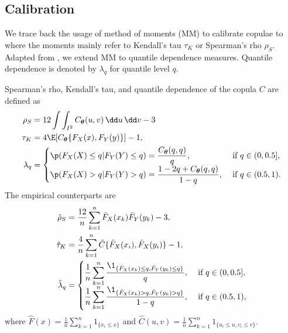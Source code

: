 \documentclass[11pt,a4paper,english]{article}
\begin{document}
\subsection{Calibration}\label{sec:estimation}
We trace back the usage of method of moments (MM) to calibrate copulae to \citet{Genest1987, genest1993statistical} 
where the moments mainly refer to Kendall's tau $\tau_K$ or Spearman's rho $\rho_S$.
Adapted from \cite{oh2013simulated}, we extend MM to quantile dependence measures. 
Quantile dependence is denoted by $\lambda_q$ for quantile level $q$.

Spearman's rho, Kendall's tau, and quantile dependence of the copula $C$ are defined as
\begin{align*}
  \rho_S &= 12 \int\int_{I^2} C_{\bm{\theta}}(u,v)\, \dd u\, \dd v-3\label{eq:rho_S}\\
  \tau_K &= 4\E[C_{\bm{\theta}}\{F_X(x), F_Y(y)\}]-1,\\
  \lambda_q &=
  \begin{cases}
    \p(F_X(X)\leq q| F_Y(Y)\leq q) = \displaystyle \frac{C_{\bm{\theta}}(q,q)}{q},
    &\text{ if } q\in (0,0.5],\\
    \p(F_X(X)>q|F_Y(Y)>q) =\displaystyle \frac{1-2q+C_{\bm{\theta}}(q,q)} {1-q},
    &\text{ if } q\in (0.5,1).
  \end{cases}
\end{align*}
The empirical counterparts are
\begin{align*}
  \hat\rho_S &= \frac{12}{n} \sum_{k=1}^n \hat F_X(x_k) \hat F_Y(y_k)
               -3,\\
  \hat\tau_K &= \frac{4}{n}\sum_{k=1}^n \hat{C}\{\hat{F}_X(x_i),\hat{F}_X(y_i)\} -1 ,\\
  \hat\lambda_q &=
                  \begin{cases}
                    \displaystyle\frac{1}{n} \sum_{k=1}^n \frac{\1_{\{\hat
                        F_X(x_k)\leq q, \hat F_Y(y_k)\leq q\}}} {q},
                    &\text { if } q\in (0, 0.5],\\
                    \displaystyle \frac{1}{n} \sum_{k=1}^n
                    \frac{\1_{\{\hat F_X(x_k)>q, \hat F_Y(y_k)>q\}}}
                    {1-q}, &\text { if } q\in (0.5,1),
                  \end{cases}
\end{align*}
where $\displaystyle \hat{F}(x) =
  \frac{1}{n}\sum_{k=1}^n 1_{\{x_i\leq x\}}$ and
$\displaystyle \hat{C}(u,v) = \frac{1}{n}\sum_{k=1}^n 1_{\{u_i\leq u, v_i\leq v\}}$. 
\end{document}

